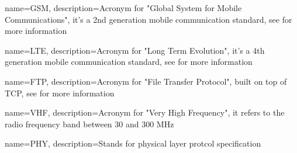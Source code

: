 {
    name=GSM,
    description={Acronym for "Global System for Mobile Communications", it's a 2nd generation mobile communication
    standard, see \cite{gsm_book} for more information}
}

{
    name=LTE,
    description={Acronym for "Long Term Evolution", it's a 4th generation mobile communication standard, see \cite{lte_paper} for more information}
}

{
    name=FTP,
    description={Acronym for "File Transfer Protocol", built on top of TCP, see \cite{ftp_rfc} for more information}
}

{
    name=VHF,
    description={Acronym for "Very High Frequency", it refers to the radio frequency band between 30 and 300 MHz}
}

{
    name=PHY,
    description={Stands for physical layer protcol specification}
}

\makeglossaries
